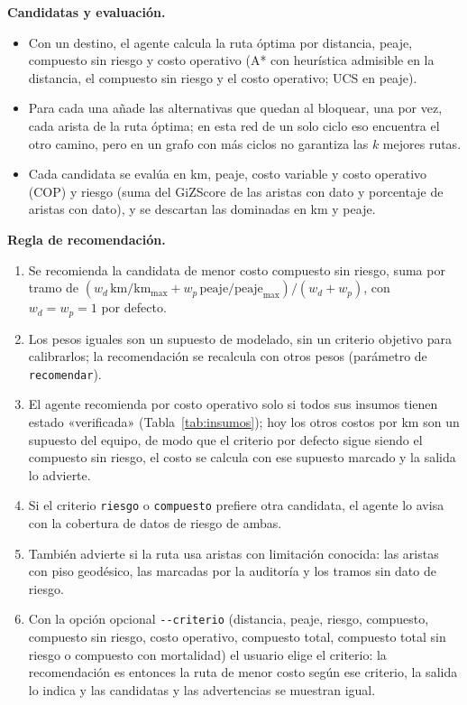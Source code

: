 \documentclass[12pt,a4paper]{article}
\begin{document}
\textbf{Candidatas y evaluación.}
\begin{itemize}
\item Con un destino, el agente calcula la ruta óptima por distancia, peaje,
compuesto sin riesgo y costo operativo (A* con heurística admisible en la
distancia, el compuesto sin riesgo y el costo operativo; UCS en peaje).
\item Para cada una añade las alternativas que quedan al bloquear, una por vez,
cada arista de la ruta óptima; en esta red de un solo ciclo eso encuentra el
otro camino, pero en un grafo con más ciclos no garantiza las $k$ mejores
rutas.
\item Cada candidata se evalúa en km, peaje, costo variable y costo operativo
(COP) y riesgo (suma del GiZScore de las aristas con dato y porcentaje de
aristas con dato), y se descartan las dominadas en km y peaje.
\end{itemize}

\textbf{Regla de recomendación.}
\begin{enumerate}
\item Se recomienda la candidata de menor costo compuesto sin riesgo, suma por
tramo de
$(w_d\, \mathrm{km}/\mathrm{km}_{\max} + w_p\, \mathrm{peaje}/
\mathrm{peaje}_{\max})/(w_d + w_p)$, con $w_d = w_p = 1$ por defecto.
\item Los pesos iguales son un supuesto de modelado, sin un criterio objetivo
para calibrarlos; la recomendación se recalcula con otros pesos (parámetro de
\texttt{recomendar}).
\item El agente recomienda por costo operativo solo si todos sus insumos tienen
estado «verificada» (Tabla~\ref{tab:insumos}); hoy los otros costos por km son
un supuesto del equipo, de modo que el criterio por defecto sigue siendo el
compuesto sin riesgo, el costo se calcula con ese supuesto marcado y la salida
lo advierte.
\item Si el criterio \texttt{riesgo} o \texttt{compuesto} prefiere otra
candidata, el agente lo avisa con la cobertura de datos de riesgo de ambas.
\item También advierte si la ruta usa aristas con limitación conocida:
las aristas con piso geodésico, las marcadas por la auditoría y
los tramos sin dato de riesgo.
\item Con la opción opcional \texttt{-{}-criterio} (distancia, peaje, riesgo,
compuesto, compuesto sin riesgo, costo operativo, compuesto total, compuesto
total sin riesgo o compuesto con mortalidad) el usuario elige el criterio: la
recomendación es entonces la ruta de menor costo según ese criterio, la salida
lo indica y las candidatas y las advertencias se muestran igual.
\end{enumerate}
\end{document}
